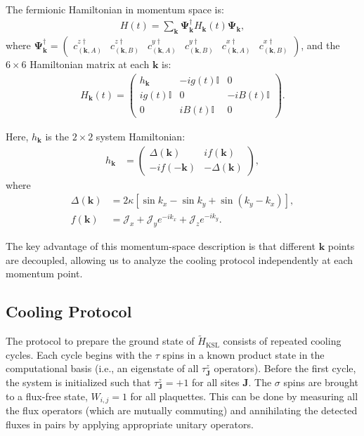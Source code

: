 \documentclass[twocolumn,
aps,
prx,
showpacs,
amsmath,
amssymb,
floatfix,
longbibliography,
superscriptaddress,
eprint]
{revtex4-1}
\begin{document}
The fermionic Hamiltonian in momentum space is:
\begin{align}
H(t)=\sum_{\bm{k}}\bm{\Psi}_{\bm{k}}^\dagger H_{\bm{k}}(t)\bm{\Psi}_{\bm{k}},
\end{align}
where $\bm{\Psi}_{\bm{k}}^\dagger=\begin{pmatrix}c_{(\bm{k},A)}^{z\dagger}&
c_{(\bm{k},B)}^{z\dagger}&
c_{(\bm{k},A)}^{y\dagger}&
c_{(\bm{k},B)}^{y\dagger}&
c_{(\bm{k},A)}^{x\dagger}&
c_{(\bm{k},B)}^{x\dagger}
\end{pmatrix}$,
and the $6 \times 6$ Hamiltonian matrix at each $\bm{k}$ is:
\begin{align}
H_{\bm{k}}(t)=\left(\begin{array}{ccc}
h_{\bm{k}} & -ig(t)\mathbb{I} & 0\\
ig(t)\mathbb{I} & 0 & -iB(t)\mathbb{I}\\
0 & iB(t)\mathbb{I} & 0
\end{array}\right).
\label{eq:Hk}
\end{align}

Here, $h_{\bm{k}}$ is the $2 \times 2$ system Hamiltonian:
\begin{align}
h_{\bm{k}}&=\begin{pmatrix} \Delta(\bm{k}) & if(\bm{k})\\
-if(-\bm{k}) & -\Delta(\bm{k})
\end{pmatrix},
\label{eq:h_k}
\end{align}
where
\begin{align}
\Delta(\bm{k})&=2\kappa\left[\sin{k_x}-\sin{k_y}+\sin{(k_y-k_x)}\right],\\
f(\bm{k})&=\mathcal{J}_{x}+\mathcal{J}_{y}e^{-ik_{x}}+\mathcal{J}_{z}e^{-ik_{y}}.
\end{align}

The key advantage of this momentum-space description is that different $\bm{k}$ points are decoupled, allowing us to analyze the cooling protocol independently at each momentum point.

\subsection{Cooling Protocol}

The protocol to prepare the ground state of $\widetilde{H}_{\text{KSL}}$ consists of repeated cooling cycles. Each cycle begins with the $\tau$ spins in a known product state in the computational basis (i.e., an eigenstate of all $\tau^z_{\mathbf{J}}$ operators). Before the first cycle, the system is initialized such that $\tau^z_{\mathbf{J}} = +1$ for all sites $\mathbf{J}$. The $\sigma$ spins are brought to a flux-free state, $W_{i,j} = 1$ for all plaquettes. This can be done by measuring all the flux operators (which are mutually commuting) and annihilating the detected fluxes in pairs by applying appropriate unitary operators.
\end{document}
